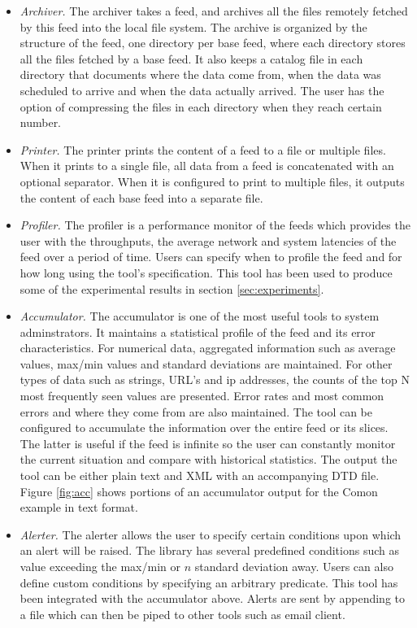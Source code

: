 \begin{itemize}
\item {\em Archiver.} The archiver takes a feed, and archives all the files
remotely fetched by this feed into the local file system. The archive
is organized by the structure of the feed, one directory per base feed,
where each directory stores all the files fetched by a base feed. 
It also keeps a catalog file in each directory that documents where 
the data come from, when the data was scheduled to arrive and when
the data actually arrived. The user has the option of compressing
the files in each directory when they reach certain number. 

\item {\em Printer.} The printer prints the content of a feed to a file or
multiple files. When it prints to a single file, all data from a feed is
concatenated with an optional separator. When it is configured to print
to multiple files, it outputs the content of each base feed into a separate
file.

\item {\em Profiler.} The profiler is a performance monitor of the feeds which
provides the user with the throughputs, the average network and system latencies
of the feed over a period of time. Users can specify when to profile the feed and
for how long using the tool's specification. This tool has been used to produce
some of the experimental results in section \ref{sec:experiments}.

\item {\em Accumulator.} The accumulator is one of the most useful tools to system
adminstrators. It maintains a statistical profile of the feed and
its error characteristics. For numerical data, aggregated information such as 
average values, max/min values and standard deviations are maintained. For other
types of data such as strings, URL's and ip addresses, the counts of the top N
most frequently seen values are presented. Error rates and most common errors
and where they come from are also maintained. The tool can be configured to
accumulate the information over the entire feed or its slices. The latter is
useful if the feed is infinite so the user can constantly monitor the 
current situation and compare with historical statistics. 
The output the tool can be either plain text and XML with an
accompanying DTD file. Figure \ref{fig:acc} shows portions of an accumulator
output for the Comon example in text format.

\item {\em Alerter.} The alerter allows the user to specify certain conditions
upon which an alert will be raised. The library has several predefined
conditions such as value exceeding the max/min or $n$ standard deviation away. 
Users can also define custom conditions by specifying an arbitrary predicate. 
This tool has been integrated with the accumulator above. Alerts are sent by
appending to a file which can then be piped to other tools such as email
client.


\end{itemize}

